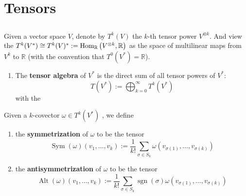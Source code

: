 \documentclass[12pt, oneside]{book}
\begin{document}
\chapter{Tensors}
\section{}
Given a vector space $V$, denote by $T^k(V)$ the $k$-th tensor power $V^{\otimes k}$.
And view the $T^k(V^*)\cong T^k(V)^*:=\operatorname{\operatorname{Hom}}_{\mathbb{R}}\left(V^{\otimes k} ,\mathbb{R} \right)$ as the space of multilinear maps from $V^k$ to $\mathbb{R}$ (with the convention that $T^0(V^*)=\mathbb{R}$).


\begin{definition}
    \begin{enumerate}
        \item The \textbf{tensor algebra} of $V^*$ is the direct sum of all tensor powers of $V^*$:
              \begin{equation*}
                  T(V^*)
                  :=
                  \bigoplus_{k=0}^\infty T^k(V^*)
              \end{equation*}
              with the

    \end{enumerate}

\end{definition}



\begin{definition}
    Given a $k$-covector $\omega \in T^k(V^*)$ , we define
    \begin{enumerate}
        \item the \textbf{symmetrization} of $\omega$ to be the tensor
              \begin{equation*}
                  \operatorname{Sym}(\omega)(v_1, \ldots, v_k)
                  :=
                  \frac{1}{k!} \sum_{\sigma \in S_k} \omega\left(v_{\sigma(1)}, \ldots, v_{\sigma(k)}\right)
              \end{equation*}
        \item the \textbf{antisymmetrization} of $\omega$ to be the tensor
              \begin{equation*}
                  \operatorname{Alt}(\omega)(v_1, \ldots, v_k)
                  :=
                  \frac{1}{k!} \sum_{\sigma \in S_k} \operatorname{sgn}(\sigma) \omega\left(v_{\sigma(1)}, \ldots, v_{\sigma(k)}\right)
              \end{equation*}
    \end{enumerate}
\end{definition}
\end{document}
